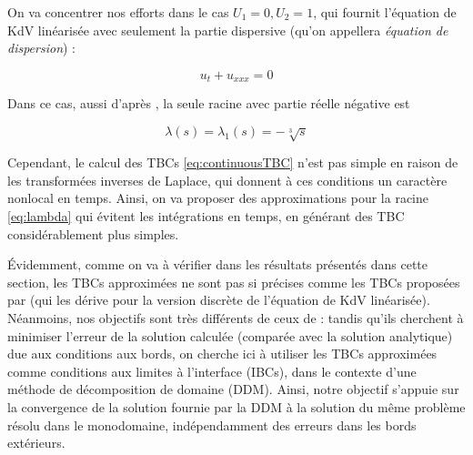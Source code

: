 \indent On va concentrer nos efforts dans le cas $U_1 = 0, U_2 = 1$, qui fournit l'équation de KdV linéarisée avec seulement la partie dispersive (qu'on appellera \emph{équation de dispersion}) :

\begin{equation}
	\label{eq:DKdV}
	u_t + u_{xxx} = 0
\end{equation}

\indent Dans ce cas, aussi d'après \cite{zheng2008}, la seule racine avec partie réelle négative est

\begin{equation}
	\label{eq:lambda}
			\lambda(s) = \lambda_1(s) =  -\sqrt[3]{s} 
\end{equation}

\indent Cependant, le calcul des TBCs \eqref{eq:continuousTBC} n'est pas simple en raison de les transformées inverses de Laplace, qui donnent à ces conditions un caractère nonlocal en temps. Ainsi, on va proposer des approximations pour la racine \eqref{eq:lambda} qui évitent les intégrations en temps, en générant des TBC considérablement plus simples.


\indent Évidemment, comme on va à vérifier dans les résultats présentés dans cette section, les TBCs approximées ne sont pas si précises comme les TBCs proposées par \cite{besse2015} (qui les dérive pour la version discrète de l'équation de KdV linéarisée). Néanmoins, nos objectifs sont très différents de ceux de \cite{besse2015} : tandis qu'ils cherchent à minimiser l'erreur de la solution calculée (comparée avec la solution analytique) due aux conditions aux bords, on cherche ici à utiliser les TBCs approximées comme conditions aux limites à l'interface (IBCs), dans le contexte d'une méthode de décomposition de domaine (DDM). Ainsi, notre objectif s'appuie sur la convergence de la solution fournie par la DDM à la solution du même problème résolu dans le monodomaine,  indépendamment des erreurs dans les bords extérieurs. 

